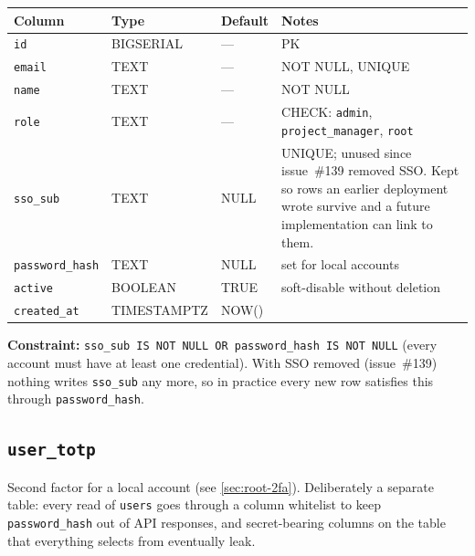 \documentclass[12pt,a4paper,twoside]{report}
\newcommand{\code}[1]{\texttt{#1}}
\begin{document}
\begin{table}[H]
  \centering\small
  \begin{tabular}{@{}llll@{}}
    \toprule
    \textbf{Column} & \textbf{Type} & \textbf{Default} & \textbf{Notes} \\
    \midrule
    \code{id}            & BIGSERIAL & --- & PK \\
    \code{email}         & TEXT      & --- & NOT NULL, UNIQUE \\
    \code{name}          & TEXT      & --- & NOT NULL \\
    \code{role}          & TEXT      & --- & CHECK: \code{admin}, \code{project\_manager}, \code{root} \\
    \code{sso\_sub}      & TEXT      & NULL & UNIQUE; unused since issue~\#139 removed SSO. Kept so rows an earlier deployment wrote survive and a future implementation can link to them. \\
    \code{password\_hash}& TEXT      & NULL & set for local accounts \\
    \code{active}        & BOOLEAN   & TRUE & soft-disable without deletion \\
    \code{created\_at}   & TIMESTAMPTZ & NOW() & \\
    \bottomrule
  \end{tabular}
\end{table}

\noindent\textbf{Constraint:} \code{sso\_sub IS NOT NULL OR password\_hash IS NOT NULL}
(every account must have at least one credential). With SSO removed
(issue~\#139) nothing writes \code{sso\_sub} any more, so in practice every new
row satisfies this through \code{password\_hash}.

\subsection*{\texttt{user\_totp}}

Second factor for a local account (see \autoref{sec:root-2fa}). Deliberately a
separate table: every read of \code{users} goes through a column whitelist to
keep \code{password\_hash} out of API responses, and secret-bearing columns on
the table that everything selects from eventually leak.
\end{document}
